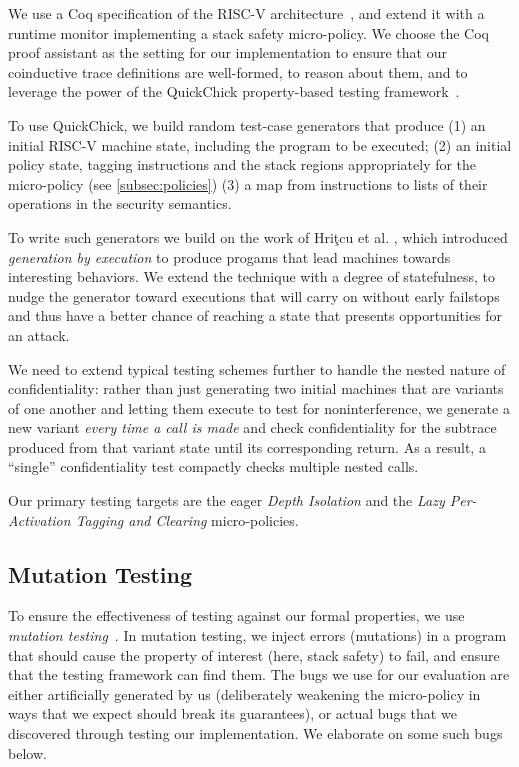 \documentclass[10pt,conference]{ieeetran}%
\theoremstyle{definition}
\begin{document}
We use a Coq specification of the RISC-V architecture~\cite{Bourgeat2021AMF},
and extend it with a runtime monitor implementing a stack safety
micro-policy. We choose the Coq proof assistant as the setting for our implementation
to ensure that our coinductive trace definitions are well-formed, to reason about
them, and to leverage the power of the QuickChick property-based testing framework~\cite{Pierce:SF4}.

To use QuickChick, we build random test-case generators that produce
(1) an initial RISC-V machine state, including the program to be executed;
(2)
  an initial policy state, tagging instructions and the stack regions appropriately
  for the micro-policy (see \cref{subsec:policies})
(3)
  a map from instructions to lists of their operations in the security semantics.

To write such generators we build on the work of
Hri\c{t}cu et al. \cite{TestingNI:ICFP, DBLP:journals/jfp/HritcuLSADHPV16}, which
introduced {\em generation by execution} to produce progams that lead
machines towards interesting behaviors. We extend the technique with a degree
of statefulness, to nudge the generator toward executions that will carry
on without early failstops and thus have a better chance of reaching a
state that presents opportunities for an attack.

We need to extend typical testing schemes further to handle the nested
nature of confidentiality: rather than just generating two
initial machines that are variants of one another and letting them
execute to test for noninterference, we generate a new variant
{\em every time a call is made} and check confidentiality for the
subtrace produced from that variant state until its corresponding
return. As a result, a ``single'' confidentiality test compactly
checks multiple nested calls.

Our primary testing targets are the eager {\em Depth Isolation}
and the {\em Lazy Per-Activation Tagging and Clearing} micro-policies.

\subsection{Mutation Testing}

To ensure the effectiveness of testing against our formal properties, we
use {\em mutation testing}~\cite{JiaH11}. In mutation testing, we inject errors
(mutations) in a program that should cause the property of interest (here,
stack safety) to fail, and ensure that the testing framework can find
them. The bugs we use for our evaluation are either artificially generated
by us (deliberately weakening the micro-policy in ways that we expect
should break its guarantees), or actual bugs that we discovered through
testing our implementation. We elaborate on some such bugs below.
\end{document}
